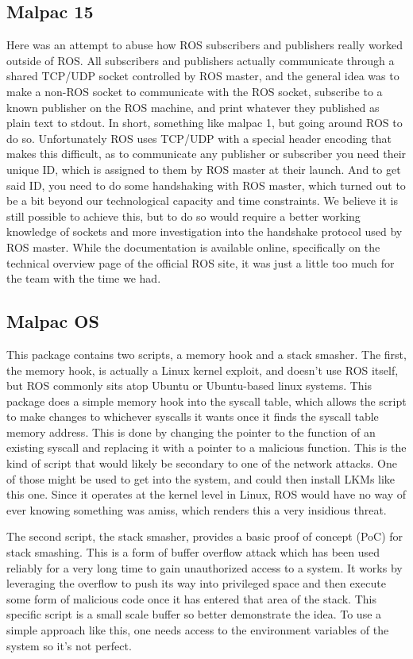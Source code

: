 \documentclass[IEEEtran,letterpaper,10pt,notitlepage,draftclsnofoot,onecolumn]{article}
\begin{document}
\subsection{Malpac 15}
Here was an attempt to abuse how ROS subscribers and publishers really worked outside of ROS.
All subscribers and publishers actually communicate through a shared TCP/UDP socket controlled by ROS master, and the general idea was to make a non-ROS socket to communicate with the ROS socket, subscribe to a known publisher on the ROS machine, and print whatever they published as plain text to stdout.
In short, something like malpac 1, but going around ROS to do so. Unfortunately ROS uses TCP/UDP with a special header encoding that makes this difficult, as to communicate any publisher or subscriber you need their unique ID, which is assigned to them by ROS master at their launch.
And to get said ID, you need to do some handshaking with ROS master, which turned out to be a bit beyond our technological capacity and time constraints.
We believe it is still possible to achieve this, but to do so would require a better working knowledge of sockets and more investigation into the handshake protocol used by ROS master.
While the documentation is available online, specifically on the technical overview page of the official ROS site\cite{ROS}, it was just a little too much for the team with the time we had.

\subsection{Malpac OS}
This package contains two scripts, a memory hook and a stack smasher.
The first, the memory hook, is actually a Linux kernel exploit, and doesn't use ROS itself, but ROS commonly sits atop Ubuntu or Ubuntu-based linux systems.
This package does a simple memory hook into the syscall table, which allows the script to make changes to whichever syscalls it wants once it finds the syscall table memory address.
This is done by changing the pointer to the function of an existing syscall and replacing it with a pointer to a malicious function.
This is the kind of script that would likely be secondary to one of the network attacks. One of those might be used to get into the system, and could then install LKMs like this one. Since it operates at the kernel level in Linux, ROS would have no way of ever knowing something was amiss, which renders this a very insidious threat.

The second script, the stack smasher, provides a basic proof of concept (PoC) for stack smashing.
This is a form of buffer overflow attack which has been used reliably for a very long time to gain unauthorized access to a system.
It works by leveraging the overflow to push its way into privileged space and then execute some form of malicious code once it has entered that area of the stack.
This specific script is a small scale buffer so better demonstrate the idea.
To use a simple approach like this, one needs access to the environment variables of the system so it's not perfect.
\end{document}
